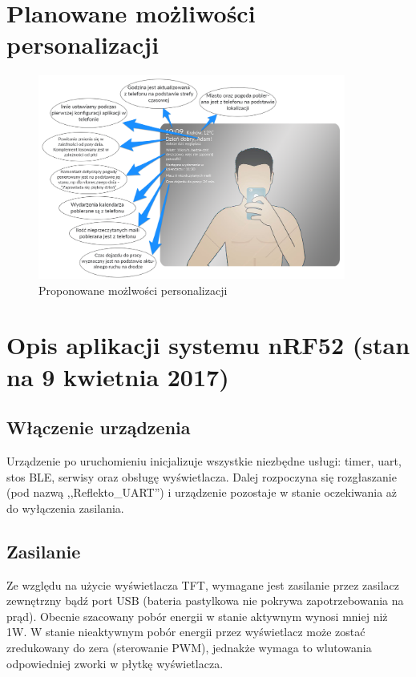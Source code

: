 \documentclass[a4paper,11pt]{article}
\begin{document}
\section{Planowane możliwości personalizacji}
\begin{figure}[H]
	\includegraphics[width=0.9\textwidth,center]{dymki_kreski.png}
	\caption {Proponowane możlwości personalizacji}
	\label{lustro_on}
\end{figure}

\section{Opis aplikacji systemu nRF52 (stan na 9 kwietnia 2017) }

\subsection{Włączenie urządzenia}
Urządzenie po uruchomieniu inicjalizuje wszystkie niezbędne usługi: timer, uart, stos BLE, serwisy oraz obsługę wyświetlacza. Dalej rozpoczyna się rozgłaszanie (pod nazwą ,,Reflekto\_UART'') i urządzenie pozostaje w stanie oczekiwania aż do wyłączenia zasilania. 
\subsection{Zasilanie}
Ze względu na użycie wyświetlacza TFT, wymagane jest zasilanie przez zasilacz zewnętrzny bądź port USB (bateria pastylkowa nie pokrywa zapotrzebowania na prąd). Obecnie szacowany pobór energii w stanie aktywnym wynosi mniej niż 1W. W stanie nieaktywnym pobór energii przez wyświetlacz może zostać zredukowany do zera (sterowanie PWM), jednakże wymaga to wlutowania odpowiedniej zworki w płytkę wyświetlacza.
\end{document}

